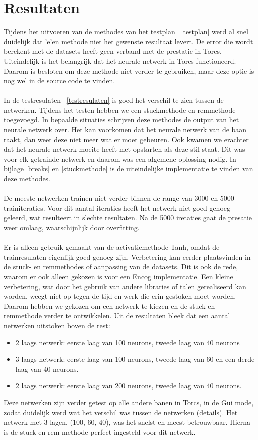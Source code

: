 \documentclass{article}
\begin{document}
\section{Resultaten}
Tijdens het uitvoeren van de methodes van het testplan ~\ref{testplan} werd al snel duidelijk dat 'e'en methode niet het gewenste resultaat levert. De error die wordt berekent met de datasets heeft geen verband met de prestatie in Torcs. Uiteindelijk is het belangrijk dat het neurale netwerk in Torcs functioneerd. Daarom is besloten om deze methode niet verder te gebruiken, maar deze optie is nog wel in de source code te vinden.  \\\\
In de testresulaten ~\ref{testresulaten} is goed het verschil te zien tussen de netwerken. Tijdens het testen hebben we een stuckmethode en remmethode toegevoegd. In bepaalde situaties schrijven deze methodes de output van het neurale netwerk over. Het kan voorkomen dat het neurale netwerk van de baan raakt, dan weet deze niet meer wat er moet gebeuren. Ook kwamen we erachter dat het neurale netwerk moeite heeft met opstarten als deze stil staat. Dit was voor elk getrainde netwerk en daarom was een algemene oplossing nodig. In bijlage \ref{breaks} en \ref{stuckmethode} is de uiteindelijke implementatie te vinden van deze methodes. \\\\
De meeste netwerken trainen niet verder binnen de range van 3000 en 5000 trainiteraties. Voor dit aantal iteraties heeft het netwerk niet goed genoeg geleerd, wat resulteert in slechte resultaten. Na de 5000 iretaties gaat de presatie weer omlaag, waarschijnlijk door overfitting. \\\\
Er is alleen gebruik gemaakt van de activatiemethode Tanh, omdat de trainresulaten eigenlijk goed genoeg zijn. Verbetering kan eerder plaatsvinden in de stuck- en remmethodes of aanpassing van de datasets. Dit is ook de rede, waarom er ook alleen gekozen is voor een Encog implementatie. Een kleine verbetering, wat door het gebruik van andere libraries of talen gerealiseerd kan worden, weegt niet op tegen de tijd en werk die erin gestoken moet worden. Daarom hebben we gekozen om een netwerk te kiezen en de stuck en -remmethode verder te ontwikkelen. Uit de resultaten bleek dat een aantal netwerken uitstoken boven de rest:
\begin{itemize}
\item 2 laags netwerk: eerste laag van 100 neurons, tweede laag van 40 neurons
\item 3 laags netwerk: eerste laag van 100 neurons, tweede laag van 60 en een derde laag van 40 neurons.
\item 2 laags netwerk: eerste laag van 200 neurons, tweede laag van 40 neurons. 
\end{itemize}
Deze netwerken zijn verder getest op alle andere banen in Torcs, in de Gui mode, zodat duidelijk werd wat het verschil was tussen de netwerken (details). Het netwerk met 3 lagen, (100, 60, 40), was het snelst en meest betrouwbaar. Hierna is de stuck en rem methode perfect ingesteld voor dit netwerk.
 \pagebreak
\end{document}
